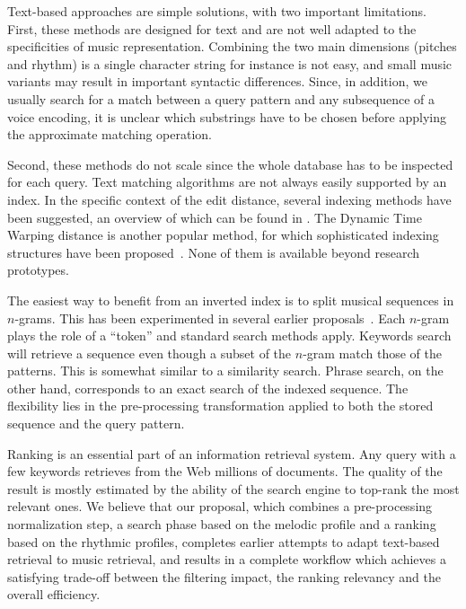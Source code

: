 \documentclass[letterpaper, 11pt]{article}
\begin{document}
Text-based approaches are simple solutions, with two important limitations. First, these methods are 
designed for text and are not well adapted to the specificities of music representation. Combining
the two main dimensions (pitches and rhythm) is a single character string for instance is not easy, 
and small music variants may result in important syntactic differences.  Since, in addition,
we usually search for a match between a query pattern and any subsequence of a voice encoding, 
it is unclear which substrings have to be chosen before applying the approximate matching operation. 

Second, these methods
do not scale since the whole database has to be inspected for each query.
Text matching algorithms are not always easily supported by an index. In the specific context of the edit
distance, several indexing methods have been suggested, an overview of which can be found in \cite{Navarro00}.
The Dynamic Time Warping distance is another popular method, for which sophisticated indexing structures
have been proposed~\cite{KR05}. None of them is available beyond research prototypes.

The easiest way to benefit
from an inverted index is to split musical sequences in $n$-grams. This has been
experimented in several earlier proposals~\cite{Downie99,NO04,DR04,CJ06}. Each $n$-gram plays the role
of a ``token'' and standard search methods apply. Keywords search will retrieve a sequence 
even though a subset of the $n$-gram match those of the patterns. This is somewhat similar to a similarity search.
Phrase search, on the other hand, corresponds to an exact search of the indexed sequence. The flexibility lies
in the pre-processing transformation applied to both the stored sequence and the query pattern.

Ranking is an essential part of an information retrieval system. Any query with a few keywords retrieves from the Web
millions of documents. The quality of the result is mostly estimated by the ability of the search engine to top-rank
the most relevant ones. We believe that our proposal, which combines a pre-processing normalization step,
a search phase based on the melodic profile and a ranking based on the rhythmic profiles, completes earlier
attempts to adapt text-based retrieval to music retrieval, and results in a complete workflow
which achieves a satisfying trade-off between the filtering impact, the ranking relevancy and
the overall efficiency.

\end{document}
